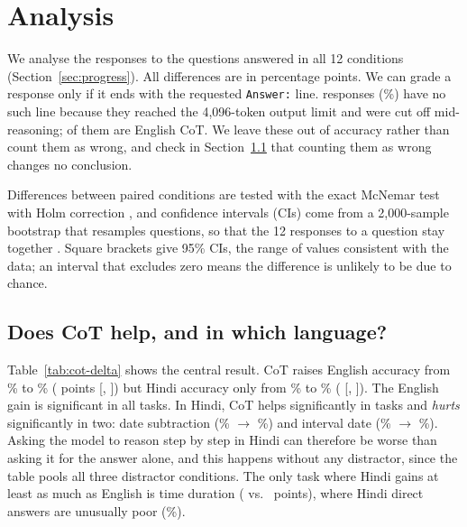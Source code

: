 \section{Analysis}
\label{sec:analysis}

We analyse the \NRecords{} responses to the \NQuestions{} questions answered in all 12 conditions (Section~\ref{sec:progress}). All differences are in percentage points. We can grade a response only if it ends with the requested \texttt{Answer:} line. \NCutoff{} responses (\NCutoffPct{}\%) have no such line because they reached the 4,096-token output limit and were cut off mid-reasoning; \NCutoffEnCot{} of them are English CoT. We leave these out of accuracy rather than count them as wrong, and check in Section~\ref{sec:cot-delta} that counting them as wrong changes no conclusion.

Differences between paired conditions are tested with the exact McNemar test \citep{mcnemar-1947-note} with Holm correction \citep{holm-1979-simple}, and confidence intervals (CIs) come from a 2,000-sample bootstrap that resamples questions, so that the 12 responses to a question stay together \citep{berg-kirkpatrick-etal-2012-empirical,dror-etal-2018-hitchhikers}. Square brackets give 95\% CIs, the range of values consistent with the data; an interval that excludes zero means the difference is unlikely to be due to chance.

\subsection{Does CoT help, and in which language?}
\label{sec:cot-delta}



Table~\ref{tab:cot-delta} shows the central result. CoT raises English accuracy from \EnDirectAcc{}\% to \EnCotAcc{}\% (\EnCotDelta{} points [\EnCotDeltaLo{}, \EnCotDeltaHi{}]) but Hindi accuracy only from \HiDirectAcc{}\% to \HiCotAcc{}\% (\HiCotDelta{} [\HiCotDeltaLo{}, \HiCotDeltaHi{}]). The English gain is significant in all \NEnSigPos{} tasks. In Hindi, CoT helps significantly in \NHiSigPos{} tasks and \emph{hurts} significantly in two: date subtraction (\HiSubtractionDirect{}\% $\rightarrow$ \HiSubtractionCot{}\%) and interval date (\HiIntervalDirect{}\% $\rightarrow$ \HiIntervalCot{}\%). Asking the model to reason step by step in Hindi can therefore be worse than asking it for the answer alone, and this happens without any distractor, since the table pools all three distractor conditions. The only task where Hindi gains at least as much as English is time duration (\HiTimeDurationDelta{} vs.\ \EnTimeDurationDelta{} points), where Hindi direct answers are unusually poor (\HiTimeDurationDirect{}\%).

